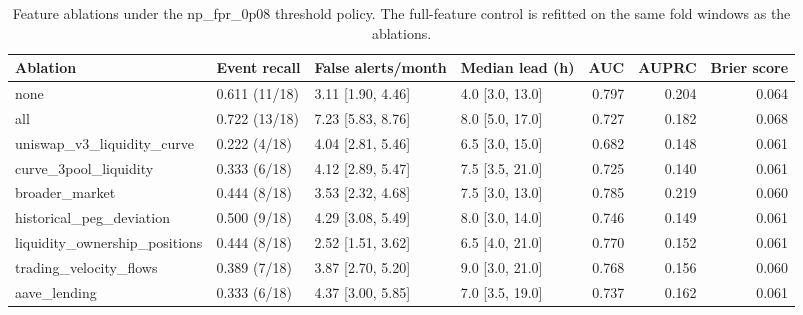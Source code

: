 \begin{table}
\caption{Feature ablations under the np\_fpr\_0p08 threshold policy. The full-feature control is refitted on the same fold windows as the ablations.}
\label{tab:ablation_15_kumo_tabular}
\begin{tabular}{llllrrr}
\toprule
Ablation & Event recall & False alerts/month & Median lead (h) & AUC & AUPRC & Brier score \\
\midrule
none & 0.611 (11/18) & 3.11 [1.90, 4.46] & 4.0 [3.0, 13.0] & 0.797 & 0.204 & 0.064 \\
all & 0.722 (13/18) & 7.23 [5.83, 8.76] & 8.0 [5.0, 17.0] & 0.727 & 0.182 & 0.068 \\
uniswap\_v3\_liquidity\_curve & 0.222 (4/18) & 4.04 [2.81, 5.46] & 6.5 [3.0, 15.0] & 0.682 & 0.148 & 0.061 \\
curve\_3pool\_liquidity & 0.333 (6/18) & 4.12 [2.89, 5.47] & 7.5 [3.5, 21.0] & 0.725 & 0.140 & 0.061 \\
broader\_market & 0.444 (8/18) & 3.53 [2.32, 4.68] & 7.5 [3.0, 13.0] & 0.785 & 0.219 & 0.060 \\
historical\_peg\_deviation & 0.500 (9/18) & 4.29 [3.08, 5.49] & 8.0 [3.0, 14.0] & 0.746 & 0.149 & 0.061 \\
liquidity\_ownership\_positions & 0.444 (8/18) & 2.52 [1.51, 3.62] & 6.5 [4.0, 21.0] & 0.770 & 0.152 & 0.061 \\
trading\_velocity\_flows & 0.389 (7/18) & 3.87 [2.70, 5.20] & 9.0 [3.0, 21.0] & 0.768 & 0.156 & 0.060 \\
aave\_lending & 0.333 (6/18) & 4.37 [3.00, 5.85] & 7.0 [3.5, 19.0] & 0.737 & 0.162 & 0.061 \\
\bottomrule
\end{tabular}
\end{table}
